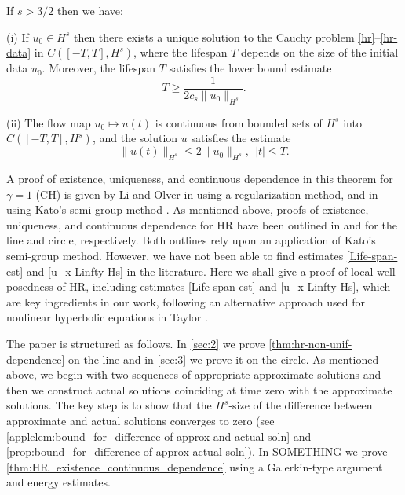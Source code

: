 %
%
%
%
%
%
\begin{theorem}
\label{thm:HR_existence_continuous_dependence}
If   $s>3/2$  then we have:

(i) If $u_0\in H^s$  then  there exists a unique solution to
the Cauchy problem  \eqref{hr}--\eqref{hr-data} in $C([-T, T], H^s)$, where 
the lifespan  $T$ depends on the size
of the initial data $u_0$. Moreover, 
the  lifespan $T$ satisfies the lower bound estimate 
%
%
%
\begin{equation}
\label{Life-span-est}
T
\ge
\frac{1}{2c_s \|u_0\|_{H^s}}.
\end{equation}
%

(ii)
The flow map $u_0 \mapsto u(t)$ is continuous from
bounded sets of $H^s$ into \\ $C([-T, T], H^s)$,
and the solution $u$ satisfies the estimate
%
%
%
\begin{equation}
\label{u_x-Linfty-Hs}
\|
u(t)
\|_ {H^s}
\le
2
\|
u_0
\|_{H^s}, \ \ |t|\le T.
\end{equation}
%
%
%
\end{theorem}
%
%
A proof of existence, uniqueness, and continuous dependence in this 
theorem for $\gamma =1$ (CH) 
is given  by Li and Olver in 
\cite{Li_2000_Well-posedness-} using a regularization method, and in
\cite{Rodriguez-Blanco_2001_On-the-Cauchy-p} using 
Kato's semi-group method \cite{Kato_1975_Quasi-linear-eq}. As mentioned 
above, proofs of 
existence, uniqueness, and continuous dependence for  HR
have been outlined in \cite{Yin_2003_On-the-Cauchy-p} and 
\cite{Zhou_2005_Local-well-pose} for the line and circle, 
respectively. Both outlines rely upon an application of Kato's semi-group 
method. However, we have not been able to find estimates  
\eqref{Life-span-est} and \eqref{u_x-Linfty-Hs}  in the literature.
Here we shall give a proof of local well-posedness of HR,
including  estimates \eqref{Life-span-est} and \eqref{u_x-Linfty-Hs},
which are key ingredients in our work, 
following an alternative approach used for nonlinear hyperbolic equations
in Taylor \cite{Taylor_1991_Pseudodifferent}.

The paper is structured as follows. In \cref{sec:2} we prove 
\cref{thm:hr-non-unif-dependence} on the line and 
in  \cref{sec:3}  we prove it on the circle.
As mentioned above, we begin with two sequences of
appropriate approximate solutions and then 
we construct  actual solutions
coinciding at time zero  with the approximate solutions.
The key step is to show that  the $H^s$-size of
the difference between approximate and actual solutions 
converges to zero (see \cref{applelem:bound_for_difference-of-approx-and-actual-soln}
and \cref{prop:bound_for_difference-of-approx-actual-soln}). 
In SOMETHING we prove \cref{thm:HR_existence_continuous_dependence} 
using a Galerkin-type argument and energy estimates.
%
%
%
%	
%
%
%
%
%
%
%
%
%
%
%
